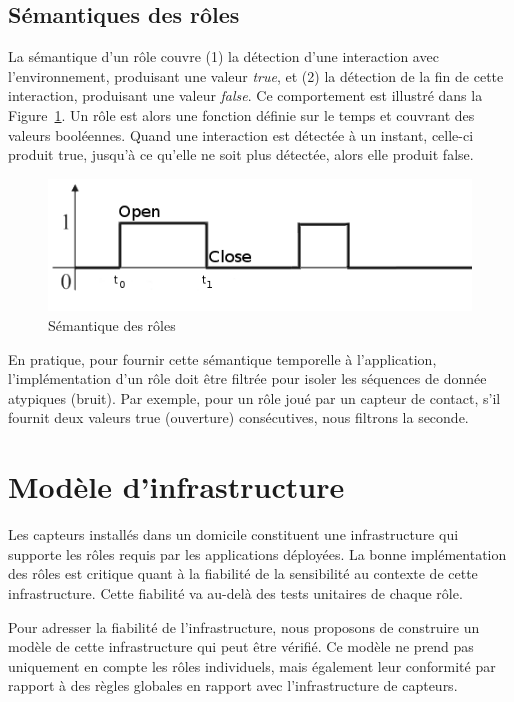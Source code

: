 \subsection{Sémantiques des rôles}
La sémantique d'un rôle couvre (1) la détection d'une interaction avec l'environnement, produisant une valeur {\em true}, et (2) la détection de la fin de cette interaction, produisant une valeur {\em false}. Ce comportement est illustré dans la Figure~\ref{fig:semofroles}. Un rôle est alors une fonction définie sur le temps et couvrant des valeurs booléennes. Quand une interaction est détectée à un instant, celle-ci produit true, jusqu'à ce qu'elle ne soit plus détectée, alors elle produit false.


\begin{figure}[!h]
  \centering
      \includegraphics[scale=0.3]{gfx/graph.png}
      \caption{Sémantique des rôles}
      \label{fig:semofroles}
\end{figure}

En pratique, pour fournir cette sémantique temporelle à l'application, l'implémentation d'un rôle doit être filtrée pour isoler les séquences de donnée atypiques (bruit). Par exemple, pour un rôle joué par un capteur de contact, s'il fournit deux valeurs true (ouverture) consécutives, nous filtrons la seconde.

\section{Modèle d'infrastructure}
Les capteurs installés dans un domicile constituent une infrastructure qui supporte les rôles requis par les applications déployées. 
La bonne implémentation des rôles est critique quant à la fiabilité de la sensibilité au contexte de cette infrastructure. 
Cette fiabilité va au-delà des tests unitaires de chaque rôle.

Pour adresser la fiabilité de l'infrastructure, nous proposons de construire un modèle de cette infrastructure qui peut être vérifié. Ce modèle ne prend pas uniquement en compte les rôles individuels, mais également leur conformité par rapport à des règles globales en rapport avec l'infrastructure de capteurs.


